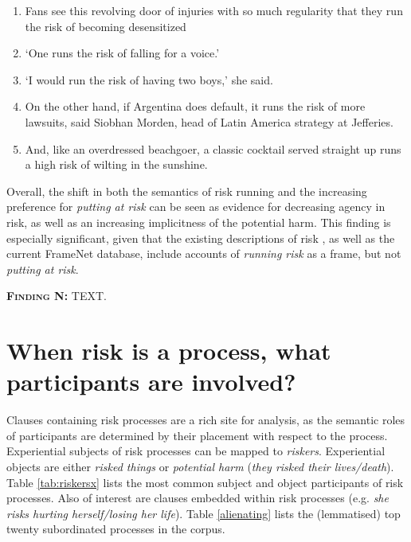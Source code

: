             \begin{enumerate} [before=\itshape,font=\normalfont]   \setlength\itemsep{0em} \small
            \item Fans see this revolving door of injuries with so much regularity that they run the risk of becoming desensitized 
            \item `One runs the risk of falling for a voice.'
            \item `I would run the risk of having two boys,' she said.
            \item On the other hand, if Argentina does default, it runs the risk of more lawsuits, said Siobhan Morden, head of Latin America strategy at Jefferies.
            \item And, like an overdressed beachgoer, a classic cocktail served straight up runs a high risk of wilting in the sunshine.
            \end{enumerate}
            Overall, the shift in both the semantics of risk running and the increasing preference for \emph{putting at risk} can be seen as evidence for decreasing agency in risk, as well as an increasing implicitness of the potential harm. This finding is especially significant, given that the existing descriptions of risk \cite{fillmore_toward_1992}, as well as the current FrameNet database, include accounts of \emph{running risk} as a frame, but not \emph{putting at risk}.

  \noindent\colorbox{yellow!20}{%
  \parbox{1\textwidth}{%
  \textsc{\textbf{Finding N:}} TEXT.}}
		
		\section{When risk is a process, what participants are involved?}
		\FloatBarrier
		
		Clauses containing risk processes are a rich site for analysis, as the semantic roles of participants are determined by their placement with respect to the process. Experiential subjects of risk processes can be mapped to \emph{riskers}. Experiential objects are either \emph{risked things} or \emph{potential harm} (\emph{they risked their lives/death}). Table \ref{tab:riskersx} lists the most common subject and object participants of risk processes. Also of interest are clauses embedded within risk processes (e.g. \emph{she risks hurting herself/losing her life}). Table \ref{alienating} lists the (lemmatised) top twenty subordinated processes in the corpus.

